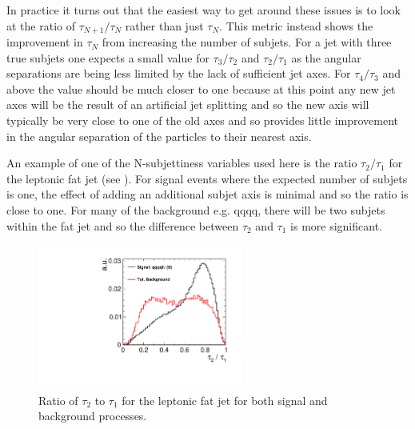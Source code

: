 In practice it turns out that the easiest way to get around these issues is to look at the ratio of $\tau_{N+1}/\tau_N$ rather than just $\tau_N$. This metric instead shows the improvement in $\tau_N$ from increasing the number of subjets. For a jet with three true subjets one expects a small value for $\tau_{3}/\tau_2$ and $\tau_{2}/\tau_1$ as the angular separations are being less limited by the lack of sufficient jet axes. For $\tau_{4}/\tau_3$ and above the value should be much closer to one because at this point any new jet axes will be the result of an artificial jet splitting and so the new axis will typically be very close to one of the old axes and so provides little improvement in the angular separation of the particles to their nearest axis.

An example of one of the N-subjettiness variables used here is the ratio $\tau_{2}/\tau_1$ for the leptonic fat jet (see ). For signal events where the expected number of subjets is one, the effect of adding an additional subjet axis is minimal and so the ratio is close to one. For many of the background e.g. qqqq, there will be two subjets within the fat jet and so the difference between $\tau_{2}$ and $\tau_1$ is more significant.

\begin{figure}
  \centering
  \includegraphics[width=0.6\textwidth]{TopAnalysis/figures/NSubJettiness.pdf}
  \caption[Ratio of $\tau_{2}$ to $\tau_1$ for the leptonic fat jet for both signal and background processes]{Ratio of $\tau_{2}$ to $\tau_1$ for the leptonic fat jet for both signal and background processes.}
  \label{fig:lepfatjetsubjet}
\end{figure}

  
